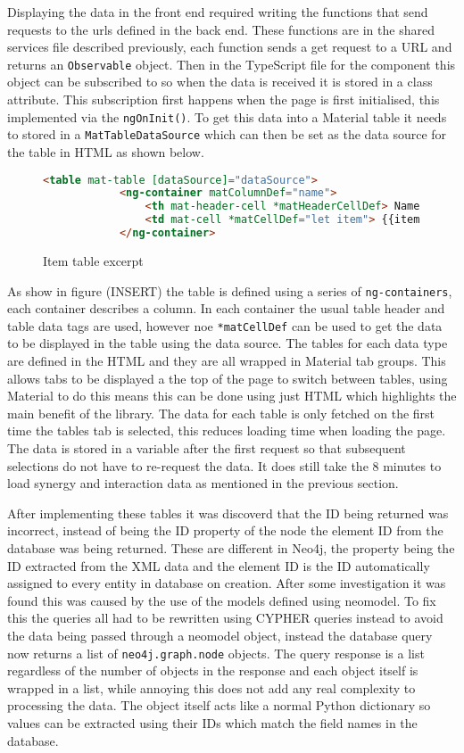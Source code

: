 Displaying the data in the front end required writing the functions that send requests to the urls defined in the back end. 
These functions are in the shared services file described previously, each function sends a get request to a URL and returns an \verb|Observable| 
object. Then in the TypeScript file for the component this object can be subscribed to so when the data is received it is stored in a class attribute. 
This subscription first happens when the page is first initialised, this implemented via the \verb|ngOnInit()|. To get this data into a Material table it needs to 
stored in a \verb|MatTableDataSource| which can then be set as the data source for the table in HTML as shown below. 
\begin{figure}
    \begin{lstlisting}[language=HTML]
        <table mat-table [dataSource]="dataSource">
            <ng-container matColumnDef="name">
                <th mat-header-cell *matHeaderCellDef> Name </th>
                <td mat-cell *matCellDef="let item"> {{item.name}} </td>
            </ng-container>
    \end{lstlisting}
    \caption{Item table excerpt}
\end{figure}
As show in figure (INSERT) the table is defined using a series of \verb|ng-containers|, each container describes a column.
In each container the usual table header and table data tags are used, however noe \verb|*matCellDef| can be used to get the data to be 
displayed in the table using the data source. The tables for each data type are defined in the HTML and they are all wrapped in Material 
tab groups. This allows tabs to be displayed a the top of the page to switch between tables, using Material to do this means this can be done 
using just HTML which highlights the main benefit of the library. The data for each table is only fetched on the first time the tables tab is selected, 
this reduces loading time when loading the page. The data is stored in a variable after the first request so that subsequent selections do not have to 
re-request the data. It does still take the 8 minutes to load synergy and interaction data as mentioned in the previous section.

After implementing these tables it was discoverd that the ID being returned was incorrect, instead of being the ID property of the node the 
element ID from the database was being returned. These are different in Neo4j, the property being the ID extracted from the XML data and the element ID is the 
ID automatically assigned to every entity in database on creation. After some investigation it was found this was caused by the use of 
the models defined using neomodel. To fix this the queries all had to be rewritten using CYPHER queries instead to avoid the data being passed through 
a neomodel object, instead the database query now returns a list of \verb|neo4j.graph.node| objects. The query response is a list regardless of 
the number of objects in the response and each object itself is wrapped in a list, while annoying this does not add any real complexity to processing the data. 
The object itself acts like a normal Python dictionary so values can be extracted using their IDs which match the field names in the database.
